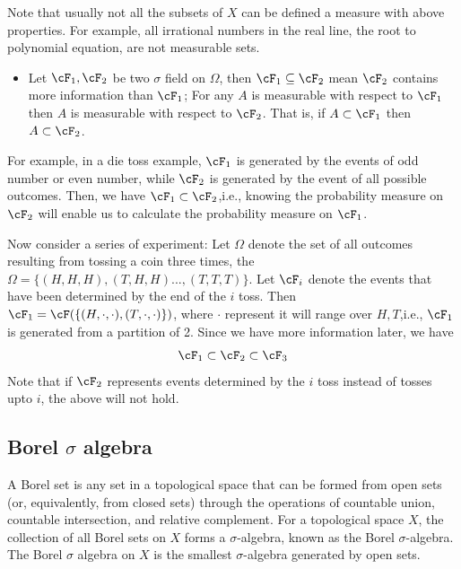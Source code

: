 \begin{refsection}
\begin{remark}
	Note that usually not all the subsets of $X$ can be defined a measure with above properties. For example, all irrational numbers in the real line, the root to polynomial equation, are not measurable sets.\cite{rosenthal2006first} 
\end{remark}

\begin{remark}\hfill
\begin{itemize}
	\item Let $\cF_1, \cF_2$ be two $\sigma$ field on $\Omega$, then $\cF_1 \subseteq \cF_2$ mean $\cF_2$ contains more information than $\cF_1$; For any $A$ is measurable with respect to $\cF_1$ then $A$ is measurable with respect to $\cF_2$. That is, if $A\subset \cF_1$ then $A\subset \cF_2$.
\end{itemize}		
\end{remark}

\begin{example}
	For example, in a die toss example, $\cF_1$ is generated by the events of odd number or even number, while $\cF_2$ is generated by the event of all possible outcomes. Then, we have $\cF_1 \subset \cF_2$,i.e., knowing the probability measure on $\cF_2$ will enable us to calculate the probability measure on $\cF_1$.\cite{dineen2013probability} 
	
	Now consider a series of experiment: Let $\Omega$ denote the set of all outcomes resulting from tossing a coin three times, the $\Omega = \{(H,H,H),(T,H,H)...,(T,T,T)\}$. Let $\cF_i$ denote the events that have been determined by the end of the $i$ toss. Then $\cF_1=\cF(\{(H,\cdot,\cdot),(T,\cdot,\cdot)\})$, where $\cdot$ represent it will range over $H,T$,i.e., $\cF_1$ is generated from a partition of 2. Since we have more information later, we have
	$$\cF_1 \subset \cF_2 \subset \cF_3$$
	Note that if $\cF_2$ represents events determined by the $i$ toss instead of tosses upto $i$, the above will not hold.
\end{example}


\subsection{Borel $\sigma$ algebra}
\begin{definition}\cite{wiki:Borelset}
A Borel set  is any set in a topological space that can be formed from open sets (or, equivalently, from closed sets) through the operations of countable union, countable intersection, and relative complement. For a topological space $X$, the collection of all Borel sets on $X$ forms a $\sigma$-algebra, known as the Borel $\sigma$-algebra. The Borel $\sigma$ algebra on $X$ is the smallest $\sigma$-algebra generated by open sets.
\end{definition}


\end{refsection}
